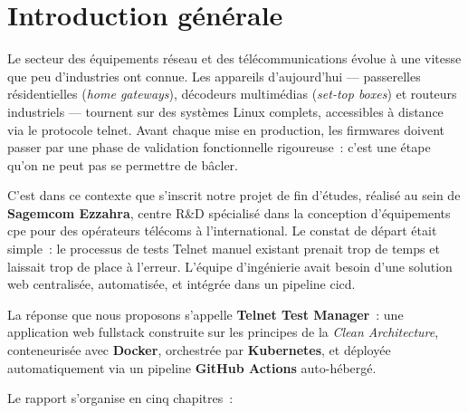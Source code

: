 \chapter*{Introduction générale}

Le secteur des équipements réseau et des télécommunications évolue à une
vitesse que peu d'industries ont connue. Les appareils d'aujourd'hui ---
passerelles résidentielles (\textit{home gateways}), décodeurs multimédias
(\textit{set-top boxes}) et routeurs industriels --- tournent sur des
systèmes Linux complets, accessibles à distance via le protocole
\gls{telnet}. Avant chaque mise en production, les firmwares doivent
passer par une phase de validation fonctionnelle rigoureuse~: c'est une
étape qu'on ne peut pas se permettre de bâcler.

C'est dans ce contexte que s'inscrit notre projet de fin d'études, réalisé
au sein de \textbf{Sagemcom Ezzahra}, centre R\&D spécialisé dans la
conception d'équipements \gls{cpe} pour des opérateurs télécoms à
l'international. Le constat de départ était simple~: le processus de tests
Telnet manuel existant prenait trop de temps et laissait trop de place à
l'erreur. L'équipe d'ingénierie avait besoin d'une solution web centralisée,
automatisée, et intégrée dans un pipeline \gls{cicd}.

La réponse que nous proposons s'appelle \textbf{Telnet Test Manager}~: une
application web fullstack construite sur les principes de la \textit{Clean
Architecture}, conteneurisée avec \textbf{Docker}, orchestrée par
\textbf{Kubernetes}, et déployée automatiquement via un pipeline
\textbf{GitHub Actions} auto-hébergé.

\vspace{0.4cm}
\noindent Le rapport s'organise en cinq chapitres~:

